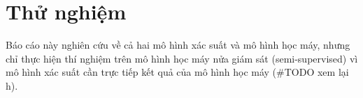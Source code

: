 \section{Thử nghiệm}
Báo cáo này nghiên cứu về cả hai mô hình xác suất và mô hình học máy, nhưng
chỉ thực hiện thí nghiệm trên mô hình học máy nửa giám sát (semi-supervised) vì
mô hình xác suất cần trực tiếp kết quả của mô hình học máy (\#TODO xem lại h).

\label{sec:experiments}
